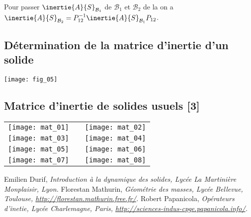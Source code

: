 \begin{resultat}
Pour passer $\inertie{A}{S}_{\mathcal{B}_1}$ de ${\mathcal{B}_1}$ et ${\mathcal{B}_2}$  de la on a $\inertie{A}{S}_{\mathcal{B}_2} = P_{12}^{-1} \inertie{A}{S}_{\mathcal{B}_1} P_{12} $.
\end{resultat}



\subsection{Détermination de la matrice d'inertie d'un solide \cite{2}}

\begin{center}
\texttt{[image: fig\_05]}
\end{center}

\subsection{Matrice d'inertie de solides usuels [3]}

\begin{center}
\begin{tabular}{ccc}
\texttt{[image: mat\_01]} & &
\texttt{[image: mat\_02]} \\ 
\texttt{[image: mat\_03]} & &
\texttt{[image: mat\_04]} \\ 
\texttt{[image: mat\_05]} & &
\texttt{[image: mat\_06]} \\ 
\texttt{[image: mat\_07]} & &
\texttt{[image: mat\_08]} \\ 
\end{tabular}
\end{center}

\begin{thebibliography}{2}
    Emilien Durif, {\it Introduction à la dynamique des solides, Lycée La Martinière Monplaisir, Lyon.}
       Florestan Mathurin, {\it Géométrie des masses, Lycée Bellevue, Toulouse, \url{http://florestan.mathurin.free.fr/}.}
       Robert Papanicola, {\it Opérateurs d'inetie, Lycée Charlemagne, Paris, \url{http://sciences-indus-cpge.papanicola.info/}.}


\end{thebibliography}

